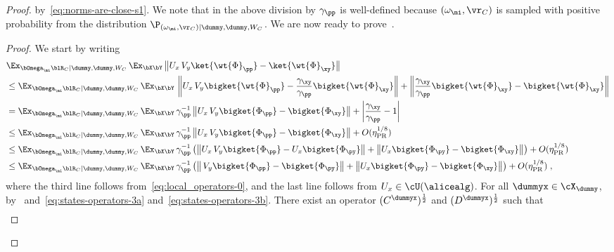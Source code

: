 \begin{proof}
	by~\eqref{eq:norms-are-close-s1}. We note that in the above division by $\gamma_\pp$ is well-defined because $(\omega_{\mi}, \vr_C)$ is sampled with positive probability from the distribution $\P_{(\omega_{\mi}, \vr_C) | \dummy,\dummy,W_C}$. We are now ready to prove~. 
	\begin{proof}
		We start by writing 
		\begin{align}
			&\Ex_{\bOmega_{\mi} \blR_C | \dummy,\dummy,W_C} \, \Ex_{\bX \bY} \, \big \| U_{x} \, V_{y} \ket{\wt{\Phi}_{\pp}} - \ket{\wt{\Phi}_{\xy}} \big\| \notag \\
			&\leq  	\Ex_{\bOmega_{\mi} \blR_C | \dummy,\dummy,W_C} \, \Ex_{\bX \bY} \, \left \| U_{x} \, V_{y} \bigket{\wt{\Phi}_{\pp}} - \frac{\gamma_\xy}{\gamma_\pp} \bigket{\wt{\Phi}_{\xy}} \right\| +  \left \| \frac{\gamma_\xy}{\gamma_\pp} \bigket{\wt{\Phi}_{\xy}} - \bigket{\wt{\Phi}_{\xy}} \right\| \notag \\
			&= 	\Ex_{\bOmega_{\mi} \blR_C | \dummy,\dummy,W_C} \, \Ex_{\bX \bY} \, \gamma_\pp^{-1} \left \| U_{x} \, V_{y} \bigket{{\Phi}_{\pp}} - \bigket{{\Phi}_{\xy}} \right\| +  \left | \frac{\gamma_\xy}{\gamma_\pp} -1  \right| \notag \\
			&\leq 	\Ex_{\bOmega_{\mi} \blR_C | \dummy,\dummy,W_C} \, \Ex_{\bX \bY} \, \gamma_\pp^{-1} \left \| U_{x} \, V_{y} \bigket{{\Phi}_{\pp}} - \bigket{{\Phi}_{\xy}} \right\| + O(\eta_{\text{PR}}^{1/8}) \notag \\
			 &\leq \Ex_{\bOmega_{\mi} \blR_C | \dummy,\dummy,W_C} \, \Ex_{\bX \bY} \, \gamma_\pp^{-1} \left( \left \| U_{x} \, V_{y} \bigket{{\Phi}_{\pp}} - U_{x} \bigket{{\Phi}_{\py}} \right\| + \left \| U_{x} \bigket{{\Phi}_{\py}} - \bigket{{\Phi}_{\xy}} \right\|\right) + O(\eta_{\text{PR}}^{1/8})  \notag \\
			  \label{eq:local_operators-1}&\leq \Ex_{\bOmega_{\mi} \blR_C | \dummy,\dummy,W_C} \, \Ex_{\bX \bY} \, \gamma_\pp^{-1} \left( \left \|  \, V_{y} \bigket{{\Phi}_{\pp}} - \bigket{{\Phi}_{\py}} \right\| + \left \| U_{x} \bigket{{\Phi}_{\py}} - \bigket{{\Phi}_{\xy}} \right\|\right) + O(\eta_{\text{PR}}^{1/8})   \;,
		\end{align}
		where the third line follows from~\eqref{eq:local_operators-0}, and the last line follows from $U_x \in \cU(\alicealg)$. For all $\dummyx \in \cX_{\dummy}$, by~ and~\eqref{eq:states-operators-3a} and~\eqref{eq:states-operators-3b}. There exist an operator $(C^{\dummyx})^{\frac{1}{2}}$ and $(D^{\dummyx})^{\frac{1}{2}}$ such that 
		\begin{align*}

\end{align*}
\end{proof}
\end{proof}
